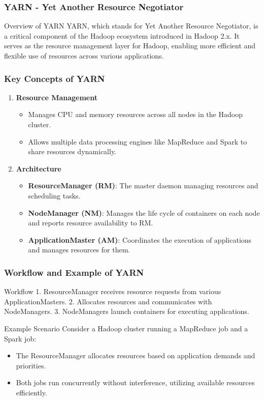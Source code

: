 \documentclass[aspectratio=169]{beamer}
\begin{document}
\begin{frame}[fragile]
    \frametitle{YARN - Yet Another Resource Negotiator}
    \begin{block}{Overview of YARN}
        YARN, which stands for Yet Another Resource Negotiator, is a critical component of the Hadoop ecosystem introduced in Hadoop 2.x. It serves as the resource management layer for Hadoop, enabling more efficient and flexible use of resources across various applications.
    \end{block}
\end{frame}

\begin{frame}[fragile]
    \frametitle{Key Concepts of YARN}
    \begin{enumerate}
        \item \textbf{Resource Management}
        \begin{itemize}
            \item Manages CPU and memory resources across all nodes in the Hadoop cluster.
            \item Allows multiple data processing engines like MapReduce and Spark to share resources dynamically.
        \end{itemize}

        \item \textbf{Architecture}
        \begin{itemize}
            \item \textbf{ResourceManager (RM)}: The master daemon managing resources and scheduling tasks.
            \item \textbf{NodeManager (NM)}: Manages the life cycle of containers on each node and reports resource availability to RM.
            \item \textbf{ApplicationMaster (AM)}: Coordinates the execution of applications and manages resources for them.
        \end{itemize}    
    \end{enumerate}
\end{frame}

\begin{frame}[fragile]
    \frametitle{Workflow and Example of YARN}
    \begin{block}{Workflow}
        1. ResourceManager receives resource requests from various ApplicationMasters. 
        2. Allocates resources and communicates with NodeManagers.
        3. NodeManagers launch containers for executing applications.
    \end{block}

    \begin{block}{Example Scenario}
        Consider a Hadoop cluster running a MapReduce job and a Spark job:
        \begin{itemize}
                \item The ResourceManager allocates resources based on application demands and priorities.
                \item Both jobs run concurrently without interference, utilizing available resources efficiently.
        \end{itemize}
    \end{block}
\end{frame}
\end{document}
